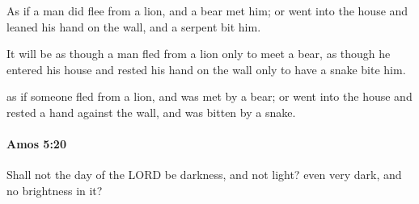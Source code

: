 			\begin{versebox}
					\item[BHS] 
					\item[LXX] 
					\item[ASV] As if a man did flee from a lion, and a bear met him; or went into the house and leaned his hand on the wall, and a serpent bit him.
					\item[NIV] It will be as though a man fled from a lion only to meet a bear, as though he entered his house and rested his hand on the wall only to have a snake bite him.
					\item[NRSV] as if someone fled from a lion, and was met by a bear; or went into the house and rested a hand against the wall, and was bitten by a snake.
			\end{versebox}

		\paragraph{Amos 5:20} %
			\label{AMOS-5-20}

			Shall not the day of the LORD be darkness, and not light? even very dark, and no brightness in it?

